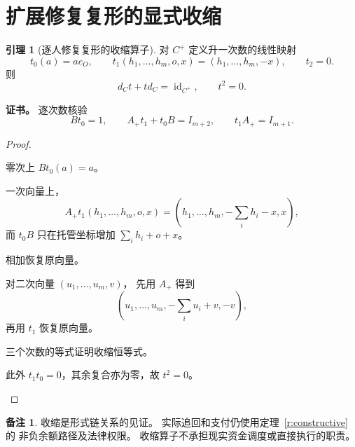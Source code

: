 \documentclass[UTF8,12pt,a4paper,openany,fontset=none,zihao=false]{ctexrep}
\theoremstyle{definition}
\newtheorem{lemma}{引理}[chapter]
\newtheorem{remark}{备注}[chapter]
\newenvironment{certificate}{\par\noindent\textbf{证书。}\ignorespaces}{\par}
\newcommand{\1}{\mathbf 1}
\begin{document}
\section{扩展修复复形的显式收缩}
\begin{lemma}[逐人修复复形的收缩算子]
\label{cyc:contraction}
对 \(C^+\) 定义升一次数的线性映射
\[
t_0(a)=ae_O,\qquad
t_1(h_1,\ldots,h_m,o,x)=(h_1,\ldots,h_m,-x),
\qquad t_2=0.
\]
则
\[
d_Ct+td_C=\operatorname{id}_{C^+},
\qquad t^2=0.
\]
\end{lemma}
\begin{certificate}
逐次数核验
\[
Bt_0=1,\qquad A_+t_1+t_0B=I_{m+2},
\qquad t_1A_+=I_{m+1}.
\]
\end{certificate}
\begin{proof}
\begin{semanticsteps}
\item 零次上 \(Bt_0(a)=a\)。
\item 一次向量上，
\[
A_+t_1(h_1,\ldots,h_m,o,x)
=(h_1,\ldots,h_m,-\sum_i h_i-x,x),
\]
而 \(t_0B\) 只在托管坐标增加 \(\sum_i h_i+o+x\)。
\item 相加恢复原向量。
\item 对二次向量 \((u_1,\ldots,u_m,v)\)，
先用 \(A_+\) 得到
\[
(u_1,\ldots,u_m,-\sum_i u_i+v,-v),
\]
再用 \(t_1\) 恢复原向量。
\item 三个次数的等式证明收缩恒等式。
\item 此外 \(t_1t_0=0\)，其余复合亦为零，故 \(t^2=0\)。
\end{semanticsteps}
\end{proof}
\begin{remark}
收缩是形式链关系的见证。
实际追回和支付仍使用定理~\ref{r:constructive} 的
非负余额路径及法律权限。
收缩算子不承担现实资金调度或直接执行的职责。
\end{remark}
\end{document}
